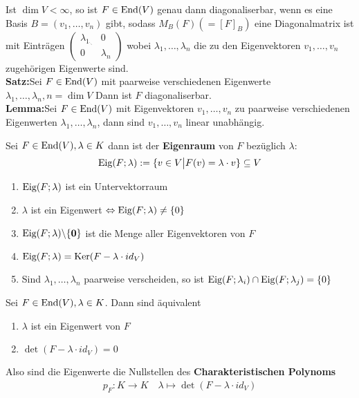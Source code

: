 Ist $\dim V < \infty$, so ist $F \in \text{End}(V)$ genau dann diagonaliserbar, wenn es eine Basis $B = (v_1, \ldots, v_n)$ gibt, sodass $M_{B}^{}(F) (= [F]_B)$ eine Diagonalmatrix ist mit Einträgen $\begin{pmatrix}
    \lambda_{1_{\ddots}} & 0\\ %
    0 & \lambda_n
\end{pmatrix}$ wobei $\lambda_1, \ldots, \lambda_n$ die zu den Eigenvektoren $v_1, \ldots, v_n$ zugehörigen Eigenwerte sind.\\
\textbf{Satz:}\quad Sei $F \in \text{End}(V)$ mit paarweise verschiedenen Eigenwerte $\lambda_1, \ldots, \lambda_n, n = \dim V$ Dann ist $F$ diagonaliserbar.\\
\textbf{Lemma:}\quad Sei $F \in \text{End}(V)$ mit Eigenvektoren $v_1, \ldots, v_n$ zu paarweise verschiedenen Eigenwerten $\lambda_1, \ldots, \lambda_n$, dann sind $v_1, \ldots, v_n$ linear unabhängig.\\
\vspace{-10pt}
\begin{mdframed}
    Sei $F \in \text{End}(V), \lambda \in K$ dann ist der \textbf{Eigenraum} von $F$ bezüglich $\lambda$:
    \begin{align*}
        \text{Eig}(F;\lambda) := \{v \in V \big\vert F(v) =\lambda \cdot v\} \subseteq V
    \end{align*}
\begin{enumerate}[{(}a{)}]
    \item $\text{Eig}(F;\lambda)$ ist ein Untervektorraum
    
    \item $\lambda$ ist ein Eigenwert $\Leftrightarrow \text{Eig}(F;\lambda) \neq \{0\}$
    
    \item $\text{Eig}(F;\lambda)\mathbf{\backslash \{0\}}$ ist die Menge aller Eigenvektoren von $F$
    
    \item $\text{Eig}(F;\lambda) = \text{Ker}(F - \lambda \cdot id_V)$
    
    \item Sind $\lambda_1, \ldots, \lambda_n$ paarweise verscheiden, so ist $\text{Eig}(F;\lambda_i) \cap \text{Eig}(F;\lambda_j) = \{0\}$
\end{enumerate}
\end{mdframed}
\begin{mdframed}
Sei $F\in \text{End}(V), \lambda \in K$. Dann sind äquivalent 
\begin{enumerate}[{(}i{)}]
    \item $\lambda$ ist ein Eigenwert von $F$
    
    \item $\det(F - \lambda \cdot id_V) = 0$
\end{enumerate}
Also sind die Eigenwerte die Nullstellen des \textbf{Charakteristischen Polynoms}
\begin{align*}
    p_F : K \rightarrow K \quad \lambda \mapsto \det(F - \lambda \cdot id_V)
\end{align*}
\end{mdframed}
